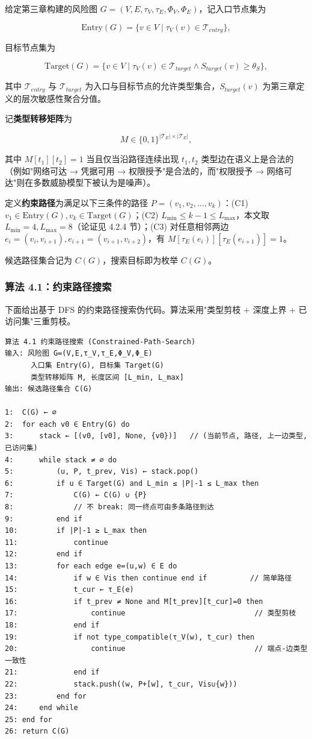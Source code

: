\documentclass[a4paper,12pt]{ctexart}
\begin{document}
给定第三章构建的风险图 $G=(V,E,\tau_V,\tau_E,\Phi_V,\Phi_E)$，记入口节点集为

\[
\text{Entry}(G) = \{ v \in V \mid \tau_V(v) \in \mathcal{T}_{entry} \},
\]

目标节点集为

\[
\text{Target}(G) = \{ v \in V \mid \tau_V(v) \in \mathcal{T}_{target} \wedge S_{target}(v) \geq \theta_S \},
\]

其中 $\mathcal{T}_{entry}$ 与 $\mathcal{T}_{target}$ 为入口与目标节点的允许类型集合，$S_{target}(v)$ 为第三章定义的层次敏感性聚合分值。

记\textbf{类型转移矩阵}为

\[
M \in \{0,1\}^{|\mathcal{T}_E| \times |\mathcal{T}_E|},
\]

其中 $M[t_1][t_2] = 1$ 当且仅当沿路径连续出现 $t_1, t_2$ 类型边在语义上是合法的（例如"网络可达 → 凭据可用 → 权限授予"是合法的，而"权限授予 → 网络可达"则在多数威胁模型下被认为是噪声）。

定义\textbf{约束路径}为满足以下三条件的路径 $P = (v_1, v_2, \dots, v_k)$：(C1) $v_1 \in \text{Entry}(G), v_k \in \text{Target}(G)$；(C2) $L_{\min} \leq k - 1 \leq L_{\max}$，本文取 $L_{\min}=4, L_{\max}=8$（论证见 4.2.4 节）；(C3) 对任意相邻两边 $e_i = (v_i, v_{i+1}), e_{i+1}=(v_{i+1}, v_{i+2})$，有 $M[\tau_E(e_i)][\tau_E(e_{i+1})] = 1$。

候选路径集合记为 $C(G)$，搜索目标即为枚举 $C(G)$。

\subsubsection{算法 4.1：约束路径搜索}

下面给出基于 DFS 的约束路径搜索伪代码。算法采用"类型剪枝 + 深度上界 + 已访问集"三重剪枝。

\begin{verbatim}
算法 4.1 约束路径搜索 (Constrained-Path-Search)
输入: 风险图 G=(V,E,τ_V,τ_E,Φ_V,Φ_E)
      入口集 Entry(G), 目标集 Target(G)
      类型转移矩阵 M, 长度区间 [L_min, L_max]
输出: 候选路径集合 C(G)

1:  C(G) ← ∅
2:  for each v0 ∈ Entry(G) do
3:      stack ← [(v0, [v0], None, {v0})]   // (当前节点, 路径, 上一边类型, 已访问集)
4:      while stack ≠ ∅ do
5:          (u, P, t_prev, Vis) ← stack.pop()
6:          if u ∈ Target(G) and L_min ≤ |P|-1 ≤ L_max then
7:              C(G) ← C(G) ∪ {P}
8:              // 不 break: 同一终点可由多条路径到达
9:          end if
10:         if |P|-1 ≥ L_max then
11:             continue
12:         end if
13:         for each edge e=(u,w) ∈ E do
14:             if w ∈ Vis then continue end if          // 简单路径
15:             t_cur ← τ_E(e)
16:             if t_prev ≠ None and M[t_prev][t_cur]=0 then
17:                 continue                              // 类型剪枝
18:             end if
19:             if not type_compatible(τ_V(w), t_cur) then
20:                 continue                              // 端点-边类型一致性
21:             end if
22:             stack.push((w, P+[w], t_cur, Vis∪{w}))
23:         end for
24:     end while
25: end for
26: return C(G)
\end{verbatim}
\end{document}
